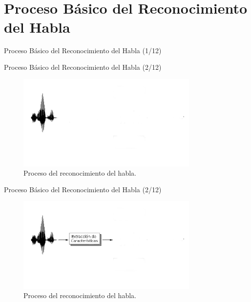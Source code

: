 \section{Proceso B\'asico del Reconocimiento del Habla}

\begin{frame}{Proceso B\'asico del Reconocimiento del Habla (1/12)}

\end{frame}

\begin{frame}{Proceso B\'asico del Reconocimiento del Habla (2/12)}

\begin{figure}[H] 
\centering
\includegraphics[width=0.8\textwidth]{./graphics/proceso_00.png}
\caption{Proceso del reconocimiento del habla.}
\label{figure:proceso}
\end{figure}
\end{frame}

\begin{frame}{Proceso B\'asico del Reconocimiento del Habla (2/12)}

\begin{figure}[H] 
\centering
\includegraphics[width=0.8\textwidth]{./graphics/proceso_0.png}
\caption{Proceso del reconocimiento del habla.}
\label{figure:proceso}
\end{figure}
\end{frame}

